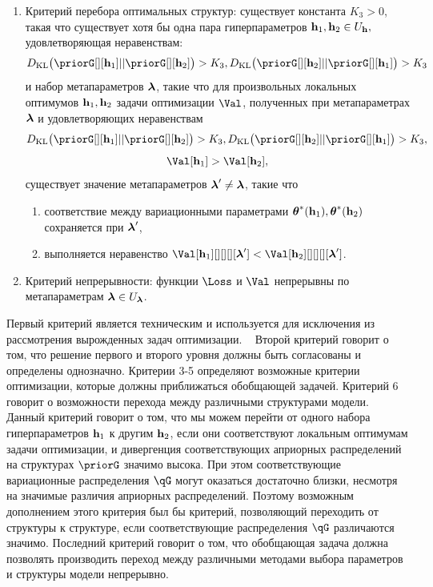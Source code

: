 \begin{defin}
\begin{enumerate}
\item Критерий перебора оптимальных структур: существует константа $K_3>0$, такая что существует хотя бы одна пара гиперпараметров $\mathbf{h}_1, \mathbf{h}_2 \in U_{\mathbf{h}},$ удовлетворяющая неравенствам:
$$\KL{\priorG[][\h_1]}{\priorG[][\h_2]} > K_3,\KL{\priorG[][\h_2]}{\priorG[][\h_1]}>K_3$$ и набор метапараметров $\boldsymbol{\lambda}$, такие что для произвольных локальных оптимумов  $\mathbf{h}_1,\mathbf{h}_2$ задачи оптимизации $\Val$, полученных при метапараметрах $\boldsymbol{\lambda}$ и удовлетворяющих неравенствам $$\KL{\priorG[][\h_1]}{\priorG[][\h_2]} > K_3, \KL{\priorG[][\h_2]}{\priorG[][\h_1]}>K_3,$$$$\Val[\h_1] > \Val[\h_2],$$  существует значение метапараметров $\boldsymbol{\lambda}' \neq \boldsymbol{\lambda}$, такие что
\begin{enumerate}
\item соответствие между вариационными параметрами $\boldsymbol{\theta}^{*}(\mathbf{h}_1),\boldsymbol{\theta}^{*}(\mathbf{h}_2)$ сохраняется при  $\boldsymbol{\lambda}'$,
\item выполняется неравенство $\Val[\h_1][][][][\lam'] < \Val[\h_2][][][][\lam']$.
\end{enumerate}


\item Критерий непрерывности: функции $\Loss$ и $\Val$ непрерывны по метапараметрам $\boldsymbol{\lambda} \in U_{\boldsymbol{\lambda}}$.
\end{enumerate}
\end{defin}
Первый критерий является техническим и используется для исключения из рассмотрения вырожденных задач оптимизации.  
Второй критерий говорит о том, что решение первого и второго уровня должны быть согласованы и определены однозначно.
Критерии 3-5 определяют возможные критерии оптимизации, которые должны приближаться обобщающей задачей.
Критерий 6 говорит о возможности перехода между различными структурами модели. Данный критерий говорит о том, что мы можем перейти от одного набора гиперпараметров $\mathbf{h}_1$ к другим $\mathbf{h}_2$, если они соответствуют локальным оптимумам задачи оптимизации, и дивергенция соответствующих априорных  распределений на структурах $\priorG$ значимо высока. При этом соответствующие вариационные распределения $\qG$ могут оказаться достаточно близки, несмотря на значимые различия априорных распределений. Поэтому возможным дополнением этого критерия был бы критерий, позволяющий переходить от структуры к структуре, если соответствующие распределения $\qG$ различаются значимо.
Последний критерий говорит о том, что обобщающая задача должна позволять производить переход между различными методами выбора  параметров и структуры модели непрерывно.

